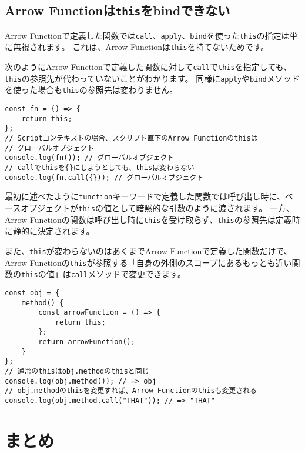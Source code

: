 \hypertarget{not-bind-arrow-function}{%
\subsection{\texorpdfstring{Arrow
Functionは\texttt{this}をbindできない}{Arrow Functionはthisをbindできない}}\label{not-bind-arrow-function}}

Arrow
Functionで定義した関数では\texttt{call}、\texttt{apply}、\texttt{bind}を使った\texttt{this}の指定は単に無視されます。
これは、Arrow
Functionは\texttt{this}を持てないためです。

次のようにArrow
Functionで定義した関数に対して\texttt{call}で\texttt{this}を指定しても、\texttt{this}の参照先が代わっていないことがわかります。
同様に\texttt{apply}や\texttt{bind}メソッドを使った場合も\texttt{this}の参照先は変わりません。

\begin{lstlisting}
const fn = () => {
    return this;
};
// Scriptコンテキストの場合、スクリプト直下のArrow Functionのthisは
// グローバルオブジェクト
console.log(fn()); // グローバルオブジェクト
// callでthisを{}にしようとしても、thisは変わらない
console.log(fn.call({})); // グローバルオブジェクト
\end{lstlisting}

最初に述べたように\texttt{function}キーワードで定義した関数では呼び出し時に、ベースオブジェクトが\texttt{this}の値として暗黙的な引数のように渡されます。
一方、Arrow
Functionの関数は呼び出し時に\texttt{this}を受け取らず、\texttt{this}の参照先は定義時に静的に決定されます。

また、\texttt{this}が変わらないのはあくまでArrow
Functionで定義した関数だけで、Arrow
Functionの\texttt{this}が参照する「自身の外側のスコープにあるもっとも近い関数の\texttt{this}の値」は\texttt{call}メソッドで変更できます。

\begin{lstlisting}
const obj = {
    method() {
        const arrowFunction = () => {
            return this;
        };
        return arrowFunction();
    }
};
// 通常のthisはobj.methodのthisと同じ
console.log(obj.method()); // => obj
// obj.methodのthisを変更すれば、Arrow Functionのthisも変更される
console.log(obj.method.call("THAT")); // => "THAT"
\end{lstlisting}

\hypertarget{conclusion}{%
\section{まとめ}\label{conclusion}}

